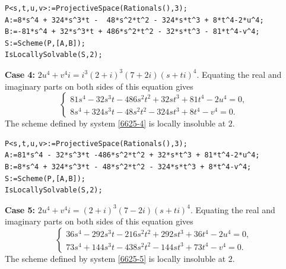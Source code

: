 \documentclass[a4paper,12pt,english,reqno]{amsart}
\begin{document}

\begin{lstlisting}
P<s,t,u,v>:=ProjectiveSpace(Rationals(),3);
A:=8*s^4 + 324*s^3*t -  48*s^2*t^2 - 324*s*t^3 + 8*t^4-2*u^4;
B:=-81*s^4 + 32*s^3*t + 486*s^2*t^2 - 32*s*t^3 - 81*t^4-v^4;
S:=Scheme(P,[A,B]);
IsLocallySolvable(S,2);
\end{lstlisting}


{\bf Case 4:} $2u^4+v^4i=i^3(2+i)^3(7+2i)(s+ti)^4$. Equating the real and imaginary parts on both sides of this equation gives
\begin{equation}\label{6625-4}
\begin{cases}
81s^4 - 32s^3t - 486s^2t^2 + 32st^3 + 81t^4 - 2u^4=0,\\
8s^4 + 324s^3t - 48s^2t^2 - 324st^3 + 8t^4 - v^4=0.
\end{cases}
\end{equation}
The scheme defined by system \eqref{6625-4} is locally insoluble at $2$.


\begin{lstlisting}
P<s,t,u,v>:=ProjectiveSpace(Rationals(),3);
A:=81*s^4 - 32*s^3*t -486*s^2*t^2 + 32*s*t^3 + 81*t^4-2*u^4;
B:=8*s^4 + 324*s^3*t - 48*s^2*t^2 - 324*s*t^3 + 8*t^4-v^4;
S:=Scheme(P,[A,B]);
IsLocallySolvable(S,2);
\end{lstlisting}




{\bf Case 5:} $2u^4+v^4i=(2+i)^3(7-2i)(s+ti)^4$. Equating the real and imaginary parts on both sides of this equation gives
\begin{equation}\label{6625-5}
\begin{cases}
36s^4 - 292s^3t - 216s^2t^2 + 292st^3 + 36t^4 - 2u^4=0,\\
73s^4 + 144s^3t - 438s^2t^2 - 144st^3 + 73t^4 - v^4=0.
\end{cases}
\end{equation}
The scheme defined by system \eqref{6625-5} is locally insoluble at $2$.
\end{document}
